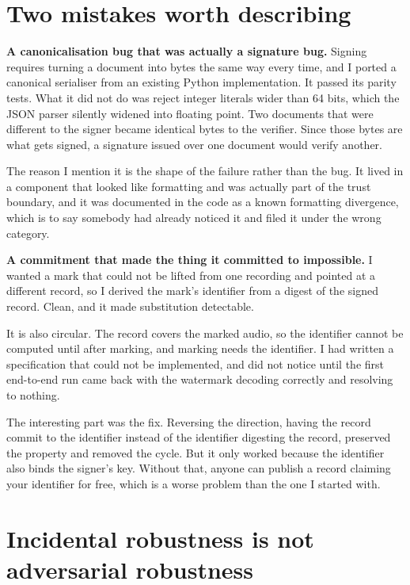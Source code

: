 \documentclass[11pt]{article}
\begin{document}
\section{Two mistakes worth describing}

\textbf{A canonicalisation bug that was actually a signature bug.} Signing
requires turning a document into bytes the same way every time, and I ported a
canonical serialiser from an existing Python implementation. It passed its
parity tests. What it did not do was reject integer literals wider than 64 bits,
which the JSON parser silently widened into floating point. Two documents that
were different to the signer became identical bytes to the verifier. Since those
bytes are what gets signed, a signature issued over one document would verify
another.

The reason I mention it is the shape of the failure rather than the bug. It
lived in a component that looked like formatting and was actually part of the
trust boundary, and it was documented in the code as a known formatting
divergence, which is to say somebody had already noticed it and filed it under
the wrong category.

\textbf{A commitment that made the thing it committed to impossible.} I wanted a
mark that could not be lifted from one recording and pointed at a different
record, so I derived the mark's identifier from a digest of the signed record.
Clean, and it made substitution detectable.

It is also circular. The record covers the marked audio, so the identifier cannot
be computed until after marking, and marking needs the identifier. I had written
a specification that could not be implemented, and did not notice until the
first end-to-end run came back with the watermark decoding correctly and
resolving to nothing.

The interesting part was the fix. Reversing the direction, having the record
commit to the identifier instead of the identifier digesting the record,
preserved the property and removed the cycle. But it only worked because the
identifier also binds the signer's key. Without that, anyone can publish a record
claiming your identifier for free, which is a worse problem than the one I
started with.

\section{Incidental robustness is not adversarial robustness}
\end{document}

